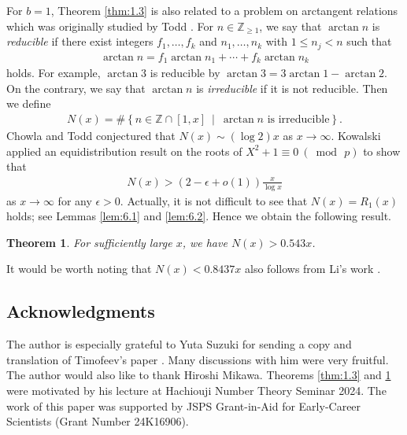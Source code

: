 \documentclass[a4paper,11pt]{amsart}
\newtheorem{theorem}{Theorem}[section]
\theoremstyle{definition}
\numberwithin{equation}{section}
\begin{document}
For $b=1$, Theorem \ref{thm:1.3} is also related to a problem on arctangent relations which was originally studied by Todd \cite{Todd1949}. 
For $n \in \mathbb{Z}_{\geq1}$, we say that $\arctan n$ is \textit{reducible} if there exist integers $f_1, \ldots, f_k$ and $n_1,\ldots,n_k$ with $1 \leq n_j<n$ such that 
\begin{align*}
\arctan n
= f_1 \arctan n_1+\cdots+f_k \arctan n_k
\end{align*}
holds. 
For example, $\arctan 3$ is reducible by $\arctan 3= 3\arctan 1-\arctan 2$. 
On the contrary, we say that $\arctan n$ is \textit{irreducible} if it is not reducible. 
Then we define 
\begin{align*}
N(x)
= \# \left\{n \in \mathbb{Z} \cap [1,x] ~\middle|~ \text{$\arctan n$ is irreducible} \right\}. 
\end{align*}
Chowla and Todd \cite{ChowlaTodd1949} conjectured that $N(x) \sim (\log{2})x$ as $x \to\infty$. 
Kowalski \cite{Kowalski2004} applied an equidistribution result on the roots of $X^2+1 \equiv 0 ~(\bmod\,{p})$ to show that
\begin{align*}
N(x)
> (2-\epsilon+o(1)) \frac{x}{\log{x}}
\end{align*}
as $x \to\infty$ for any $\epsilon>0$. 
Actually, it is not difficult to see that $N(x)=R_1(x)$ holds; see Lemmas \ref{lem:6.1} and \ref{lem:6.2}. 
Hence we obtain the following result. 

\begin{theorem}\label{thm:1.4}
For sufficiently large $x$, we have $N(x)> 0.543x$. 
\end{theorem}

It would be worth noting that $N(x)<0.8437x$ also follows from Li's work \cite{Li2024+}. 

\subsection*{Acknowledgments}
The author is especially grateful to Yuta Suzuki for sending a copy and translation of Timofeev's paper \cite{Timofeev1977}. 
Many discussions with him were very fruitful. 
The author would also like to thank Hiroshi Mikawa. 
Theorems \ref{thm:1.3} and \ref{thm:1.4} were motivated by his lecture at Hachiouji Number Theory Seminar 2024. 
The work of this paper was supported by JSPS Grant-in-Aid for Early-Career Scientists (Grant Number 24K16906). 
\end{document}

